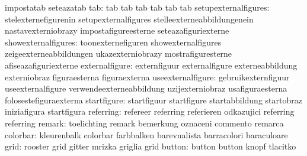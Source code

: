                                   impostatab                       seteazatab
                             tab: tab                              tab
                                  tab                              tab
                                  tab                              tab
            setupexternalfigures: stelexternefigurenin             setupexternalfigures
                                  stelleexterneabbildungenein      nastavexterniobrazy
                                  impostafigureesterne             seteazafiguriexterne
             showexternalfigures: toonexternefiguren               showexternalfigures
                                  zeigeexterneabbildungen          ukazexterniobrazy
                                  mostrafiguresterne               afiseazafiguriexterne
                  externalfigure: externfiguur                     externalfigure
                                  externeabbildung                 externiobraz
                                  figuraesterna                    figuraexterna
               useexternalfigure: gebruikexternfiguur              useexternalfigure
                                  verwendeexterneabbildung         uzijexterniobraz
                                  usafiguraesterna                 folosestefiguraexterna
                     startfigure: startfiguur                      startfigure
                                  startabbildung                   startobraz
                                  iniziafigura                     startfigura
                       referring: refereer                         referring
                                  referieren                       odkazujici
                                  referring                        referring %
                          remark: toelichting                      remark
                                  bemerkung                        oznaceni
                                  commento                         remarca
                        colorbar: kleurenbalk                      colorbar
                                  farbbalken                       barevnalista
                                  barracolori                      baraculoare
                            grid: rooster                          grid
                                  gitter                           mrizka
                                  griglia                          grid
                          button: button                           button
                                  knopf                            tlacitko

